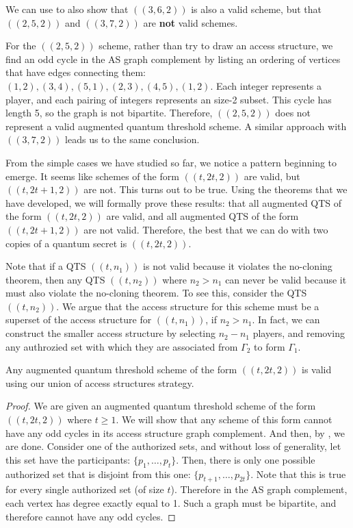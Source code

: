 We can use  to also show that $((3,6,2))$ is also a valid scheme, but that $((2,5,2))$ and $((3,7,2))$ are \textbf{not} valid schemes.

For the $((2,5,2))$ scheme, rather than try to draw an access structure, we find an odd cycle in the AS graph complement by listing an ordering of vertices that have edges connecting them: $(1,2), (3,4), (5,1), (2,3), (4,5), (1,2)$. Each integer represents a player, and each pairing of integers represents an size-2 subset. This cycle has length 5, so the graph is not bipartite. Therefore, $((2,5,2))$ does not represent a valid augmented quantum threshold scheme. A similar approach with $((3,7,2))$ leads us to the same conclusion.

From the simple cases we have studied so far, we notice a pattern beginning to emerge. It seems like schemes of the form $((t,2t,2))$ are valid, but $((t,2t+1,2))$ are not. This turns out to be true. Using the theorems that we have developed, we will formally prove these results: that all augmented QTS of the form $((t,2t,2))$ are valid, and all augmented QTS of the form $((t, 2t+1, 2))$ are not valid. Therefore, the best that we can do with two copies of a quantum secret is $((t,2t,2))$. 

\begin{remark}
    Note that if a QTS $((t,n_1))$ is not valid because it violates the no-cloning theorem, then any QTS $((t,n_2))$ where $n_2 > n_1$ can never be valid because it must also violate the no-cloning theorem. To see this, consider the QTS $((t,n_2))$. We argue that the access structure for this scheme must be a superset of the access structure for $((t,n_1))$, if $n_2 > n_1$. In fact, we can construct the smaller access structure by selecting $n_2-n_1$ players, and removing any authrozied set with which they are associated from $\Gamma_2$ to form $\Gamma_1$.
\end{remark}

\begin{theorem}
    \label{thm:t-2t-2}
    Any augmented quantum threshold scheme of the form $((t,2t,2))$ is valid using our union of access structures strategy.
\end{theorem}

\begin{proof}
    We are given an augmented quantum threshold scheme of the form $((t,2t,2))$ where $t \geq 1$. We will show that any scheme of this form cannot have any odd cycles in its access structure graph complement. And then, by , we are done. Consider one of the authorized sets, and without loss of generality, let this set have the participants: $\{p_1,\dots,p_t\}$. Then, there is only one possible authorized set that is disjoint from this one: $\{p_{t+1},\dots,p_{2t}\}$. Note that this is true for every single authorized set (of size $t$). Therefore in the AS graph complement, each vertex has degree exactly equal to 1. Such a graph must be bipartite, and therefore cannot have any odd cycles.
\end{proof}

